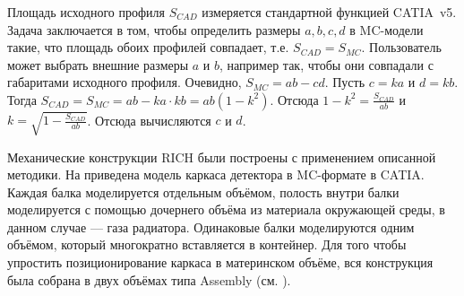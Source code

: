 Площадь исходного профиля $S_{CAD}$ измеряется стандартной функцией CATIA~v5. Задача заключается в том, чтобы определить размеры $a, b, c, d$ в MC-модели такие, что площадь обоих профилей совпадает, т.е. $S_{CAD} = S_{MC}$. Пользователь может выбрать внешние размеры $a$ и $b$, например так, чтобы они совпадали с габаритами исходного профиля. Очевидно, $S_{MC} = ab - cd$. Пусть $c = ka$ и $d = kb$. Тогда $S_{CAD} = S_{MC} = ab - ka \cdot kb = ab(1 - k^2)$. Отсюда $1 - k^2 = \frac{S_{CAD}}{ab}$ и $k = \sqrt{1 - \frac{S_{CAD}}{ab}}$. Отсюда вычисляются $c$ и $d$.

Механические конструкции RICH были построены с применением описанной методики. На  приведена модель каркаса детектора в MC-формате в CATIA. Каждая балка моделируется отдельным объёмом, полость внутри балки моделируется с помощью дочернего объёма из материала окружающей среды, в данном случае --- газа радиатора. Одинаковые балки моделируются одним объёмом, который многократно вставляется в контейнер. Для того чтобы упростить позиционирование каркаса в материнском объёме, вся конструкция была собрана в двух объёмах типа Assembly (см. ).

